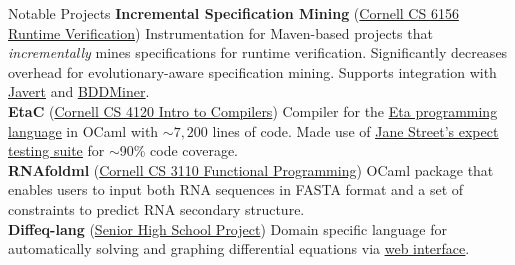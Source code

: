  
\begin{rSection}{Notable Projects}
	\textbf{Incremental Specification Mining} (\href{https://github.com/cyankaet/spec-miners}{Cornell CS 6156 Runtime Verification\ExternalLink}) Instrumentation for Maven-based projects that \textit{incrementally} mines specifications for runtime verification. Significantly decreases overhead for evolutionary-aware specification mining. Supports integration with \href{https://github.com/cyankaet/spec-miners/blob/master/miners/javert.sh}{\underline{Javert}} and \href{https://github.com/cyankaet/spec-miners/blob/master/miners/bddminer.sh}{\underline{BDDMiner}}.
	\\
	\textbf{EtaC} (\href{http://www.cs.cornell.edu/courses/cs4120/2023sp/}{Cornell CS 4120 Intro to Compilers\ExternalLink}) Compiler for the \href{https://www.cs.cornell.edu/courses/cs4120/2023sp/project/language.pdf}{\underline{Eta programming language}} in OCaml with $\sim 7,200$ lines of code. Made use of \href{https://blog.janestreet.com/the-joy-of-expect-tests/}{\underline{Jane Street's expect testing suite}} for $\sim$90\% code coverage.
	\\
	\textbf{RNAfoldml} (\href{https://github.com/jpVinnie/RNAfoldml/}{Cornell CS 3110 Functional Programming\ExternalLink}) OCaml package that enables users to input both RNA sequences in FASTA format and a set of constraints to predict RNA secondary structure.
	\\
	\textbf{Diffeq-lang} (\href{https://github.com/jpVinnie/diffeq-lang/}{Senior High School Project\ExternalLink}) Domain specific language for automatically solving and graphing differential equations via \href{https://jpramos.me/diffeq-lang/web/}{\underline{web interface}}.
\end{rSection}